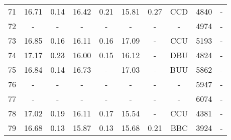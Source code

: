 \begin{longtable}{cccccccccc}
 71 & 16.71 & 0.14 & 16.42 & 0.21 & 15.81 & 0.27 & CCD & 4840 & -\\
 72 & - & - & - & - & - & - & - & 4974 & -\\
 73 & 16.85 & 0.16 & 16.11 & 0.16 & 17.09 & - & CCU & 5193 & -\\
 74 & 17.17 & 0.23 & 16.00 & 0.15 & 16.12 & - & DBU & 4824 & -\\
 75 & 16.84 & 0.14 & 16.73 & - & 17.03 & - & BUU & 5862 & -\\
 76 & - & - & - & - & - & - & - & 5947 & -\\
 77 & - & - & - & - & - & - & - & 6074 & -\\
 78 & 17.02 & 0.19 & 16.11 & 0.17 & 15.54 & - & CCU & 4381 & -\\
 79 & 16.68 & 0.13 & 15.87 & 0.13 & 15.68 & 0.21 & BBC & 3924 & -\\
\end{longtable}